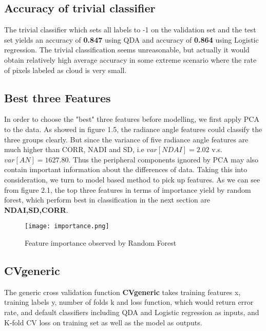 \documentclass[11pt]{scrartcl} %
\begin{document}
\subsection{Accuracy of trivial classifier}
The trivial classifier which sets all labels to -1 on the validation set and the test set yields an accuracy of \textbf{0.847} using QDA and accuracy of \textbf{0.864} using Logistic regression. The trivial classification seems unreasonable, but actually it would obtain relatively high average accuracy in some extreme scenario where the rate of pixels labeled as cloud is very small. 

\subsection{Best three Features}
In order to choose the "best" three features before modelling, we first apply PCA to the data. As showed in figure 1.5, the radiance angle features could classify the three groups clearly. But since the variance of five radiance angle features are much higher than CORR, NADI and SD, i.e $var[NDAI] = 2.02$ v.s. $var[AN] = 1627.80$. Thus the peripheral components ignored by PCA may also contain important information about the differences of data. Taking this into consideration, we turn to model based method to pick up features. As we can see from figure 2.1, the top three features in terms of importance yield by random forest, which perform best in classification in the next section are \textbf{NDAI,SD,CORR}.

\begin{figure}[htb]
	\centering
	\texttt{[image: importance.png]} %
	\caption{Feature importance observed by Random Forest}
\end{figure}

\subsection{CVgeneric}
The generic cross validation function \textbf{CVgeneric} takes training features x, training labels y, number of folds k and loss function, which would return error rate, and default classifiers including QDA and Logistic regression as inputs, and K-fold CV loss on training set as well as the model as outputs.


\end{document}
